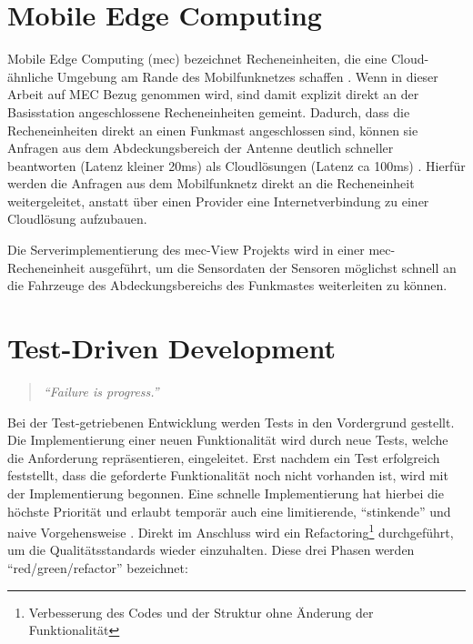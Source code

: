 \section{Mobile Edge Computing}

Mobile Edge Computing (\gls{mec}) bezeichnet Recheneinheiten, die eine Cloud-ähnliche Umgebung am Rande des Mobilfunknetzes schaffen \cite[4]{etsi:mec}.
Wenn in dieser Arbeit auf MEC Bezug genommen wird, sind damit explizit direkt an der Basisstation angeschlossene Recheneinheiten gemeint.
Dadurch, dass die Recheneinheiten direkt an einen Funkmast angeschlossen sind, können sie Anfragen aus dem Abdeckungsbereich der Antenne deutlich schneller beantworten (Latenz kleiner 20ms) als Cloudlösungen (Latenz ca 100ms) \cite[2]{perf:mec:fraunhofer}.
Hierfür werden die Anfragen aus dem Mobilfunknetz direkt an die Recheneinheit weitergeleitet, anstatt über einen Provider eine Internetverbindung zu einer Cloudlösung aufzubauen.

Die Serverimplementierung des \gls{mec}-View Projekts wird in einer \gls{mec}-Recheneinheit ausgeführt, um die Sensordaten der Sensoren möglichst schnell an die Fahrzeuge des Abdeckungsbereichs des Funkmastes weiterleiten zu können.




	
\section{Test-Driven Development}
\label{tdd}

\begin{quotation}
	\textit{\enquote{Failure is progress.}}
	\cite[5]{tdd}
\end{quotation}

Bei der Test-getriebenen Entwicklung werden Tests in den Vordergrund gestellt.
Die Implementierung einer neuen Funktionalität wird durch neue Tests, welche die Anforderung repräsentieren, eingeleitet.
Erst nachdem ein Test erfolgreich feststellt, dass die geforderte Funktionalität noch nicht vorhanden ist, wird mit der Implementierung begonnen.
Eine schnelle Implementierung hat hierbei die höchste Priorität und erlaubt temporär auch eine limitierende, \enquote{stinkende} und naive Vorgehensweise \cite[7]{tdd}.
Direkt im Anschluss wird ein Refactoring\footnote{Verbesserung des Codes und der Struktur ohne Änderung der Funktionalität} durchgeführt, um die Qualitätsstandards wieder einzuhalten.
Diese drei Phasen werden \enquote{red/green/refactor} bezeichnet:


